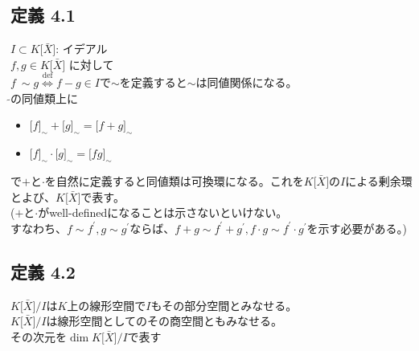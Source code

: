 \documentclass[12pt,a4paper]{article}
\begin{document}
\subsection*{定義 4.1}
  $I \subset K \lbrack \bar X \rbrack$: イデアル \\
  $f, g \in K \lbrack \bar X \rbrack$ に対して\\
  $f \ \sim g \overset{\text{def}}{\Leftrightarrow} f- g \in I$で$\sim$を定義すると$\sim$は同値関係になる。\\
  $\tilde{}$の同値類上に
  \begin{itemize}
    \item $\lbrack f \rbrack_{\sim} + \lbrack g \rbrack_{\sim} = \lbrack f + g \rbrack_{\sim} $
    \item $\lbrack f \rbrack_{\sim} \cdot \lbrack g \rbrack_{\sim} = \lbrack f g \rbrack_{\sim} $
  \end{itemize}
  で$+$と$\cdot$を自然に定義すると同値類は可換環になる。これを$K\lbrack \bar X \rbrack$の$I$による剰余環とよび、$K\lbrack \bar X \rbrack$で表す。 \\
  ($+$と$\cdot$がwell-definedになることは示さないといけない。\\ すなわち、$f \sim f^\prime, g \sim g^\prime$ならば、$f + g \sim f^\prime + g^\prime, f\cdot g \sim f^\prime \cdot g^\prime $を示す必要がある。)
\subsection*{定義 4.2}
  $K\lbrack \bar X \rbrack / I $は$K$上の線形空間で$I$もその部分空間とみなせる。\\
  $K \lbrack \bar X \rbrack / I $は線形空間としてのその商空間ともみなせる。\\
  その次元を$\dim K \lbrack \bar X \rbrack / I$で表す
\end{document}
